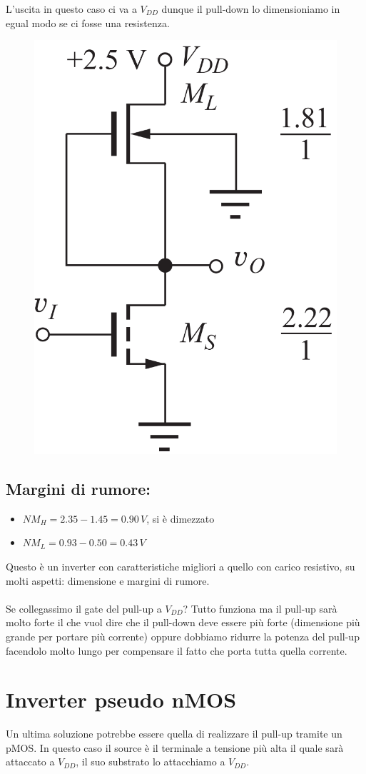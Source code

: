  L'uscita in questo caso ci va a $V_{DD}$ dunque il pull-down lo dimensioniamo in egual modo se ci fosse una resistenza.


\begin{figure}[htbp]
    \centering
    \includegraphics[width=0.25\linewidth]{img/dep_asdfv.png}    
    
\end{figure}


\newpage
\subsection{Margini di rumore: }

\begin{itemize}
    \item[] $NM_H = 2.35 - 1.45 = 0.90 \,V$, si è dimezzato
    \item[] $NM_L = 0.93 - 0.50 = 0.43 \,V$
\end{itemize}


Questo è un inverter con caratteristiche migliori a quello con carico resistivo, su molti aspetti: dimensione e margini di rumore.

\paragraph{}
Se collegassimo il gate del pull-up a $V_{DD}$? Tutto funziona ma il pull-up sarà molto forte il che vuol dire che il pull-down deve essere più forte (dimensione più grande per portare più corrente) oppure dobbiamo ridurre la potenza del pull-up facendolo molto lungo per compensare il fatto che porta tutta quella corrente.


\newpage
\section{Inverter pseudo nMOS}

Un ultima soluzione potrebbe essere quella di realizzare il pull-up tramite un pMOS. In questo caso il source è il terminale a tensione più alta il quale sarà attaccato a $V_{DD}$, il suo substrato lo attacchiamo a $V_{DD}$.

